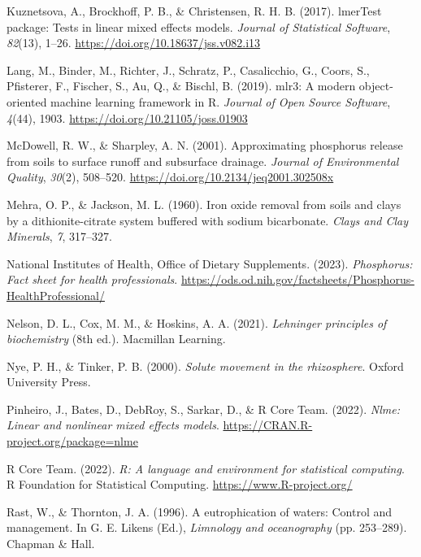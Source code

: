 \documentclass[
  a4paper,
]{article}
\newlength{\cslhangindent}
\newenvironment{CSLReferences}[2] %
 {\begin{list}{}{%
  \setlength{\itemindent}{0pt}
  \setlength{\leftmargin}{0pt}
  \setlength{\parsep}{0pt}
  \ifodd #1
   \setlength{\leftmargin}{\cslhangindent}
   \setlength{\itemindent}{-1\cslhangindent}
  \fi
  \setlength{\itemsep}{#2\baselineskip}}}
 {\end{list}}
\begin{document}
\begin{CSLReferences}{1}{0}
Kuznetsova, A., Brockhoff, P. B., \& Christensen, R. H. B. (2017).
lmerTest package: Tests in linear mixed effects models. \emph{Journal of
Statistical Software}, \emph{82}(13), 1--26.
\url{https://doi.org/10.18637/jss.v082.i13}

Lang, M., Binder, M., Richter, J., Schratz, P., Casalicchio, G., Coors,
S., Pfisterer, F., Fischer, S., Au, Q., \& Bischl, B. (2019). {mlr3}: A
modern object-oriented machine learning framework in {R}. \emph{Journal
of Open Source Software}, \emph{4}(44), 1903.
\url{https://doi.org/10.21105/joss.01903}

McDowell, R. W., \& Sharpley, A. N. (2001). Approximating phosphorus
release from soils to surface runoff and subsurface drainage.
\emph{Journal of Environmental Quality}, \emph{30}(2), 508--520.
\url{https://doi.org/10.2134/jeq2001.302508x}

Mehra, O. P., \& Jackson, M. L. (1960). Iron oxide removal from soils
and clays by a dithionite-citrate system buffered with sodium
bicarbonate. \emph{Clays and Clay Minerals}, \emph{7}, 317--327.

National Institutes of Health, Office of Dietary Supplements. (2023).
\emph{Phosphorus: Fact sheet for health professionals}.
\url{https://ods.od.nih.gov/factsheets/Phosphorus-HealthProfessional/}

Nelson, D. L., Cox, M. M., \& Hoskins, A. A. (2021). \emph{Lehninger
principles of biochemistry} (8th ed.). Macmillan Learning.

Nye, P. H., \& Tinker, P. B. (2000). \emph{Solute movement in the
rhizosphere}. Oxford University Press.

Pinheiro, J., Bates, D., DebRoy, S., Sarkar, D., \& R Core Team. (2022).
\emph{Nlme: Linear and nonlinear mixed effects models}.
\url{https://CRAN.R-project.org/package=nlme}

R Core Team. (2022). \emph{R: A language and environment for statistical
computing}. R Foundation for Statistical Computing.
\url{https://www.R-project.org/}

Rast, W., \& Thornton, J. A. (1996). A eutrophication of waters: Control
and management. In G. E. Likens (Ed.), \emph{Limnology and oceanography}
(pp. 253--289). Chapman \& Hall.


\end{CSLReferences}
\end{document}
